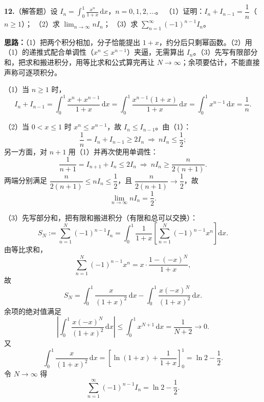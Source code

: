 
\else \answerarea[8] \fi%
\textbf{12.}（解答题）设 $\displaystyle I_{n}=\int_{0}^{1}\frac{x^{n}}{1+x}\,\mathrm{d}x$，$n=0,1,2,\dots$。
（1）证明：$I_{n}+I_{n-1}=\dfrac{1}{n}$（$n\ge1$）；
（2）求 $\displaystyle\lim_{n\to\infty}nI_{n}$；
（3）求 $\displaystyle\sum_{n=1}^{\infty}(-1)^{n-1}I_{n}$。

\ifshowsolutions%
\textbf{思路：}（1）把两个积分相加，分子恰能提出 $1+x$，约分后只剩幂函数。（2）用（1）的递推式配合单调性（$x^{n}\le x^{n-1}$）夹逼，无需算出 $I_n$。（3）先写有限部分和，把求和搬进积分，用等比求和公式算完再让 $N\to\infty$；余项要估计，不能直接声称可逐项积分。

（1）当 $n\ge1$ 时，
\[
I_{n}+I_{n-1}=\int_{0}^{1}\frac{x^{n}+x^{n-1}}{1+x}\,\mathrm{d}x
=\int_{0}^{1}\frac{x^{n-1}(1+x)}{1+x}\,\mathrm{d}x
=\int_{0}^{1}x^{n-1}\,\mathrm{d}x=\frac{1}{n}.
\]

（2）当 $0<x\le1$ 时 $x^{n}\le x^{n-1}$，故 $I_{n}\le I_{n-1}$。由（1）：
\[
\frac{1}{n}=I_{n}+I_{n-1}\ge 2I_{n}
\ \Longrightarrow\ nI_{n}\le\frac{1}{2};
\]
另一方面，对 $n+1$ 用（1）并再次使用单调性：
\[
\frac{1}{n+1}=I_{n+1}+I_{n}\le 2I_{n}
\ \Longrightarrow\ nI_{n}\ge\frac{n}{2(n+1)}.
\]
两端分别满足 $\dfrac{n}{2(n+1)}\le nI_{n}\le\dfrac12$，且 $\dfrac{n}{2(n+1)}\to\dfrac12$，故
\[
\lim_{n\to\infty}nI_{n}=\frac{1}{2}.
\]

（3）先写部分和，把有限和搬进积分（有限和总可以交换）：
\[
S_{N}:=\sum_{n=1}^{N}(-1)^{n-1}I_{n}
=\int_{0}^{1}\frac{1}{1+x}\left[\sum_{n=1}^{N}(-1)^{n-1}x^{n}\right]\mathrm{d}x.
\]
由等比求和，
\[
\sum_{n=1}^{N}(-1)^{n-1}x^{n}=x\cdot\frac{1-(-x)^{N}}{1+x},
\]
故
\[
S_{N}=\int_{0}^{1}\frac{x}{(1+x)^{2}}\,\mathrm{d}x
-\int_{0}^{1}\frac{x(-x)^{N}}{(1+x)^{2}}\,\mathrm{d}x.
\]
余项的绝对值满足
\[
\left|\int_{0}^{1}\frac{x(-x)^{N}}{(1+x)^{2}}\,\mathrm{d}x\right|
\le\int_{0}^{1}x^{N+1}\,\mathrm{d}x=\frac{1}{N+2}\longrightarrow0.
\]
又
\[
\int_{0}^{1}\frac{x}{(1+x)^{2}}\,\mathrm{d}x
=\left[\ln(1+x)+\frac{1}{1+x}\right]_{0}^{1}
=\ln2-\frac{1}{2}.
\]
令 $N\to\infty$ 得
\[
\sum_{n=1}^{\infty}(-1)^{n-1}I_{n}=\ln2-\frac{1}{2}.
\]

\else \answerarea[10] \fi%
